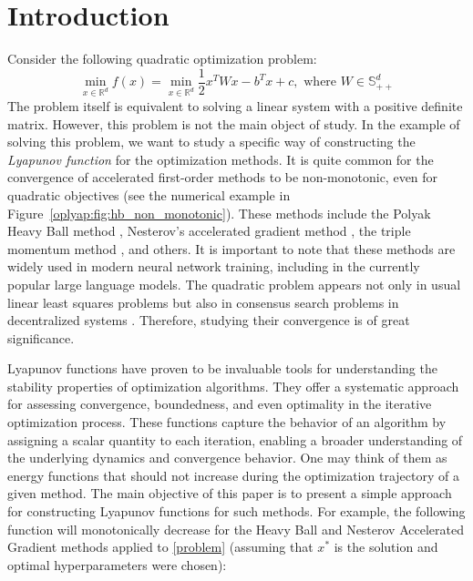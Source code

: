 \documentclass[a4paper,11pt]{article}
\begin{document}
\section{Introduction}
Consider the following quadratic optimization problem:
\begin{equation}
    \label{problem}
    \min\limits_{x \in \mathbb{R}^d} f(x) =  \min\limits_{x \in \mathbb{R}^d} \dfrac{1}{2} x^T W x - b^T x + c, \text{ where }W \in \mathbb{S}^d_{++}
\end{equation}
The problem itself is equivalent to solving a linear system with a positive definite matrix. However, this problem is not the main object of study. In the example of solving this problem, we want to study a specific way of constructing the \textit{Lyapunov function} for the optimization methods. It is quite common for the convergence of accelerated first-order methods to be non-monotonic, even for quadratic objectives \cite{goh2017why, giselsson2014monotonicity} (see the numerical example in Figure~\ref{oplyap:fig:hb_non_monotonic}). These methods include the Polyak Heavy Ball method \cite{polyak1964some}, Nesterov's accelerated gradient method \cite{nesterov2003introductory}, the triple momentum method \cite{van2017fastest}, and others. It is important to note that these methods are widely used in modern neural network training, including in the currently popular large language models. The quadratic problem appears not only in usual linear least squares problems but also in consensus search problems in decentralized systems \cite{gorbunov2022recent}. Therefore, studying their convergence is of great significance.

Lyapunov functions have proven to be invaluable tools for understanding the stability properties of optimization algorithms. They offer a systematic approach for assessing convergence, boundedness, and even optimality in the iterative optimization process. These functions capture the behavior of an algorithm by assigning a scalar quantity to each iteration, enabling a broader understanding of the underlying dynamics and convergence behavior. One may think of them as energy functions that should not increase during the optimization trajectory of a given method. The main objective of this paper is to present a simple approach for constructing Lyapunov functions for such methods. For example, the following function will monotonically decrease for the Heavy Ball and Nesterov Accelerated Gradient methods applied to \eqref{problem} (assuming that $x^*$ is the solution and optimal hyperparameters were chosen):
\end{document}
